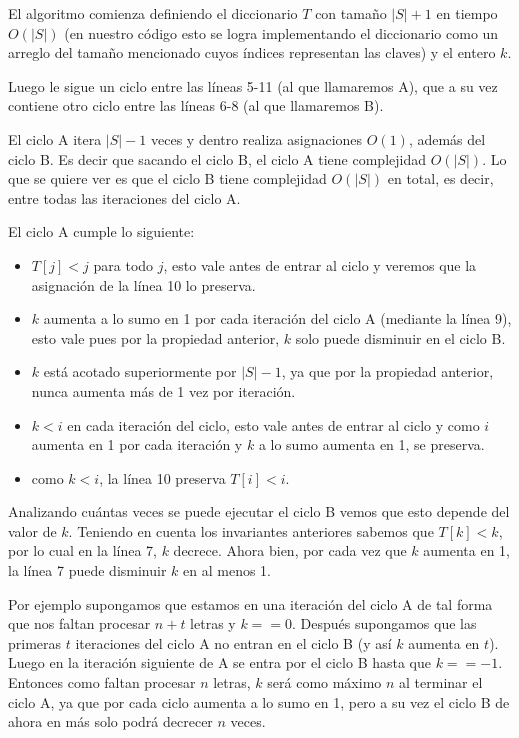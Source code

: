 El algoritmo comienza definiendo el diccionario $T$ con tamaño $|S|+1$ en tiempo $O(|S|)$ (en nuestro código esto se logra implementando el diccionario como un arreglo del tamaño mencionado cuyos índices representan las claves) y el entero $k$.

Luego le sigue un ciclo entre las líneas 5-11 (al que llamaremos A), que a su vez contiene otro ciclo
entre las líneas 6-8 (al que llamaremos B).

El ciclo A itera $|S|-1$ veces y dentro realiza asignaciones $O(1)$, además del ciclo B. Es decir que
sacando el ciclo B, el ciclo A tiene complejidad $O(|S|)$. Lo que se quiere ver es que el ciclo B tiene
complejidad $O(|S|)$ en total, es decir, entre todas las iteraciones del ciclo A.

El ciclo A cumple lo siguiente:
\begin{itemize}
	\item $T[j] < j$ para todo $j$, esto vale antes de entrar al ciclo
	y veremos que la asignación de la línea 10 lo preserva.
	\item $k$ aumenta a lo sumo en 1 por cada iteración del ciclo A (mediante la línea 9), esto vale pues por la
	propiedad anterior, $k$ solo puede disminuir en el ciclo B.
	\item $k$ está acotado superiormente por $|S|-1$, ya que por la propiedad anterior, nunca
	aumenta más de 1 vez por iteración.
	\item $k < i$ en cada iteración del ciclo, esto vale antes de entrar al ciclo
	y como $i$ aumenta en 1 por cada iteración y $k$ a lo sumo aumenta en 1, se preserva.
	\item como $k < i$, la línea 10 preserva $T[i] < i$.
\end{itemize}

Analizando cuántas veces se puede ejecutar el ciclo B vemos que esto depende del valor de $k$.
Teniendo en cuenta los invariantes anteriores sabemos que $T[k] < k$, por lo cual en la línea 7,
$k$ decrece. Ahora bien, por cada vez que $k$ aumenta en 1, la línea 7 puede disminuir $k$ en al menos 1.

Por ejemplo supongamos que estamos en una iteración del ciclo A de tal forma que nos faltan procesar $n+t$
letras y $k == 0$. Después supongamos que las primeras $t$ iteraciones del ciclo A no entran en el ciclo B
(y así $k$ aumenta en $t$). Luego en la iteración siguiente de A se entra por el ciclo B hasta que
$k == -1$. Entonces como faltan procesar $n$ letras, $k$ será como máximo $n$ al terminar el ciclo A, 
ya que por cada ciclo aumenta a lo sumo en 1, pero a su vez el ciclo B de ahora en más solo podrá
decrecer $n$ veces.

